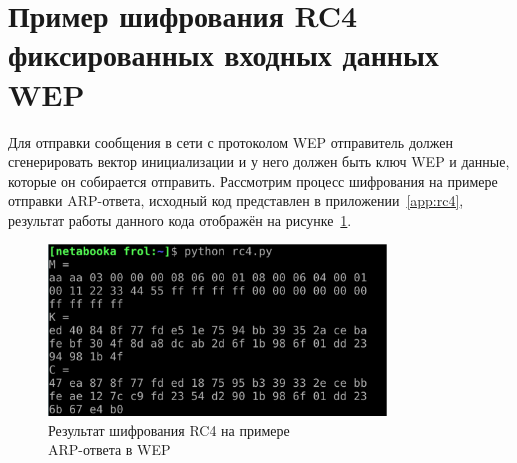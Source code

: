 \section{Пример шифрования RC4 фиксированных входных данных WEP}

Для отправки сообщения в сети с протоколом WEP отправитель должен сгенерировать
вектор инициализации и у него должен быть ключ WEP и данные, которые он
собирается отправить. Рассмотрим процесс шифрования на примере отправки
ARP-ответа, исходный код представлен в приложении~\ref{app:rc4}, результат работы
данного кода отображён на рисунке~\ref{fig:rc4_encrypt_example}.

\begin{figure}
    \centering\includegraphics[width=0.8\textwidth]{graphics/rc4_encrypt_example.eps}
    \caption{Результат шифрования RC4 на примере\\ ARP-ответа в WEP}
    \label{fig:rc4_encrypt_example}
\end{figure}

